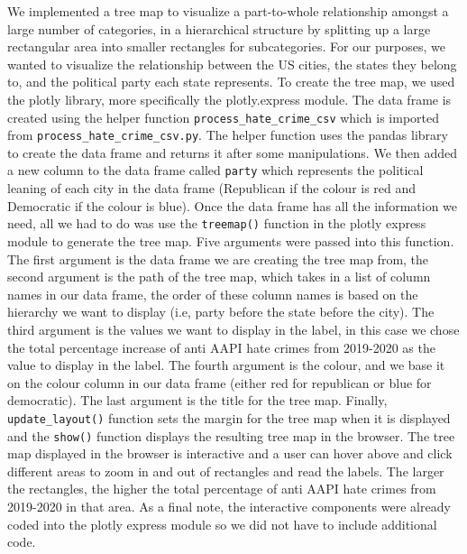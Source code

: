 \documentclass[fontsize=11pt]{article}
\begin{document}
\quad We implemented a tree map to visualize a part-to-whole relationship amongst a large number of categories, in a hierarchical structure by splitting up a large rectangular area into smaller rectangles for subcategories. For our purposes, we wanted to visualize the relationship between the US cities, the states they belong to, and the political party each state represents. To create the tree map, we used the  plotly library, more specifically the plotly.express module. The data frame is created using the helper function \texttt{process\_hate\_crime\_csv} which is imported from \texttt{process\_hate\_crime\_csv.py}. The helper function uses the pandas library to create the data frame and returns it after some manipulations. We then added a new column to the data frame called \texttt{party} which represents the political leaning of each city in the data frame (Republican if the colour is red and Democratic if the colour is blue). Once the data frame has all the information we need, all we had to do was use the \texttt{treemap()} function in the plotly express module to generate the tree map. Five arguments were passed into this function. The first argument is the data frame we are creating the tree map from, the second argument is the path of the tree map, which takes in a list of column names in our data frame, the order of these column names is based on the hierarchy we want to display (i.e, party before the state before the city). The third argument is the values we want to display in the label, in this case we chose the total percentage increase of anti AAPI hate crimes from 2019-2020 as the value to display in the label. The fourth argument is the colour, and we base it on the colour column in our data frame (either red for republican or blue for democratic). The last argument is the title for the tree map. Finally, \texttt{update\_layout()} function sets the margin for the tree map when it is displayed and the \texttt{show()} function displays the resulting tree map in the browser. The tree map displayed in the browser is interactive and a user can hover above and click different areas to zoom in and out of rectangles and read the labels. The larger the rectangles, the higher the total percentage of anti AAPI hate crimes from 2019-2020 in that area. As a final note, the interactive components were already coded into the plotly express module so we did not have to include additional code.\\
\end{document}
